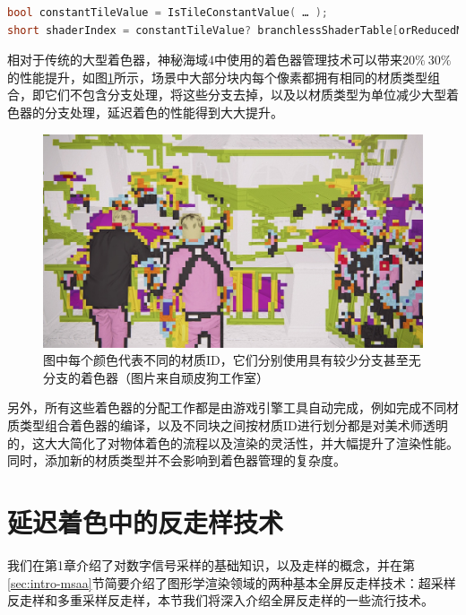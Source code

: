 \begin{lstlisting}[language=C++]
bool constantTileValue = IsTileConstantValue( … );
short shaderIndex = constantTileValue? branchlessShaderTable[orReducedMaskBits]: shaderTable[orReducedMaskBits];
\end{lstlisting}

相对于传统的大型着色器，神秘海域4中使用的着色器管理技术可以带来$20\%~30\%$的性能提升，如图\ref{f:shade-material-ID}所示，场景中大部分块内每个像素都拥有相同的材质类型组合，即它们不包含分支处理，将这些分支去掉，以及以材质类型为单位减少大型着色器的分支处理，延迟着色的性能得到大大提升。

\begin{figure}
	\includegraphics[width=1.0\textwidth]{figures/shade/material-ID}
	\caption{图中每个颜色代表不同的材质ID，它们分别使用具有较少分支甚至无分支的着色器（图片来自顽皮狗工作室）}
	\label{f:shade-material-ID}
\end{figure}

另外，所有这些着色器的分配工作都是由游戏引擎工具自动完成，例如完成不同材质类型组合着色器的编译，以及不同块之间按材质ID进行划分都是对美术师透明的，这大大简化了对物体着色的流程以及渲染的灵活性，并大幅提升了渲染性能。同时，添加新的材质类型并不会影响到着色器管理的复杂度。





\section{延迟着色中的反走样技术}\label{sec:shade-anti-aliasing}
我们在第1章介绍了对数字信号采样的基础知识，以及走样的概念，并在第\ref{sec:intro-msaa}节简要介绍了图形学渲染领域的两种基本全屏反走样技术：超采样反走样和多重采样反走样，本节我们将深入介绍全屏反走样的一些流行技术。

